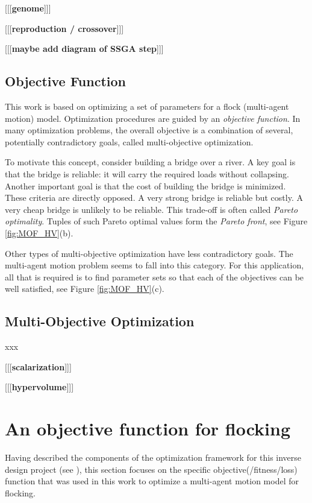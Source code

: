 \documentclass[letterpaper]{article}
\begin{document}
[[[\textbf{genome}]]]

[[[\textbf{reproduction / crossover}]]]

[[[\textbf{maybe add diagram of SSGA step}]]]

\subsection{Objective Function}
\label{subsec:Objective_Function}

This work is based on optimizing a set of parameters for a flock (multi-agent motion) model. Optimization procedures are guided by an \textit{objective function}. In many optimization problems, the overall objective is a combination of several, potentially contradictory goals, called multi-objective optimization. 

To motivate this concept, consider building a bridge over a river. A key goal is that the bridge is reliable: it will carry the required loads without collapsing. Another important goal is that the cost of building the bridge is minimized. These criteria are directly opposed. A very strong bridge is reliable but costly. A very cheap bridge is unlikely to be reliable. This trade-off is often called \textit{Pareto optimality}. Tuples of such Pareto optimal values form the \textit{Pareto front}, see Figure \ref{fig:MOF_HV}(b).

Other types of multi-objective optimization have less contradictory goals. The multi-agent motion problem seems to fall into this category. For this application, all that is required is to find parameter sets so that each of the objectives can be well satisfied, see Figure \ref{fig:MOF_HV}(c).

\subsection{Multi-Objective Optimization}
\label{subsec:Multi-Objective}

xxx

[[[\textbf{scalarization}]]]

[[[\textbf{hypervolume}]]]

\section{An objective function for flocking}
\label{sec:flocking_objecdtive}

Having described the components of the optimization framework for this inverse design project (see ), this section focuses on the specific objective(/fitness/loss) function that was used in this work to optimize a multi-agent motion model for flocking.
\end{document}
